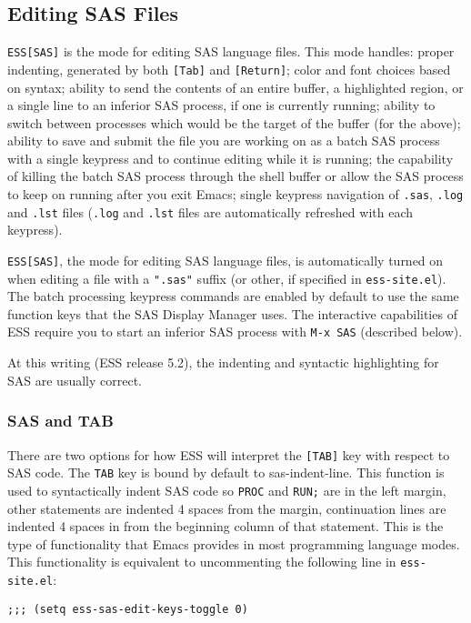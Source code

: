 \documentclass{article}
\begin{document}
\subsection{Editing SAS Files}
\label{sec:SAS:edit}

{\tt ESS[SAS]} is the mode for editing SAS language files.  This mode
handles: proper indenting, generated by both {\tt [Tab]} and {\tt [Return]}; color
and font choices based on syntax; ability to send the contents of an
entire buffer, a highlighted region, or a single line to an inferior
SAS process, if one is currently running; ability to switch between
processes which would be the target of the buffer (for the above);
ability to save and submit the file you are working on as a batch SAS
process with a single keypress and to continue editing while it is
running; the capability of killing the batch SAS process through the
shell buffer or allow the SAS process to keep on running after you
exit Emacs; single keypress navigation of {\tt .sas}, {\tt .log} and {\tt .lst} files
({\tt .log} and {\tt .lst} files are automatically refreshed with each keypress).

{\tt ESS[SAS]}, the mode for editing SAS language files, is automatically
turned on when editing a file with a {\tt ".sas"} suffix (or other, if
specified in {\tt ess-site.el}).  The batch processing keypress commands are
enabled by default to use the same function keys that the SAS Display
Manager uses.  The interactive capabilities of ESS require you to
start an inferior SAS process with {\tt M-x SAS} (described below).

At this writing (ESS release 5.2), the indenting and syntactic
highlighting for SAS are usually correct.


\subsubsection{SAS and TAB}
\label{sec:SAS:tab}

There are two options for how ESS will interpret the {\tt [TAB]} key with
respect to SAS code.  The {\tt TAB} key is bound by default to
sas-indent-line.  This function is used to syntactically indent SAS
code so {\tt PROC} and {\tt RUN;} are in the left margin, other statements are
indented 4 spaces from the margin, continuation lines are indented 4
spaces in from the beginning column of that statement.  This is the
type of functionality that Emacs provides in most programming language
modes.  This functionality is equivalent to uncommenting the following
line in {\tt ess-site.el}:
\begin{verbatim}
;;; (setq ess-sas-edit-keys-toggle 0)
\end{verbatim}
\end{document}
